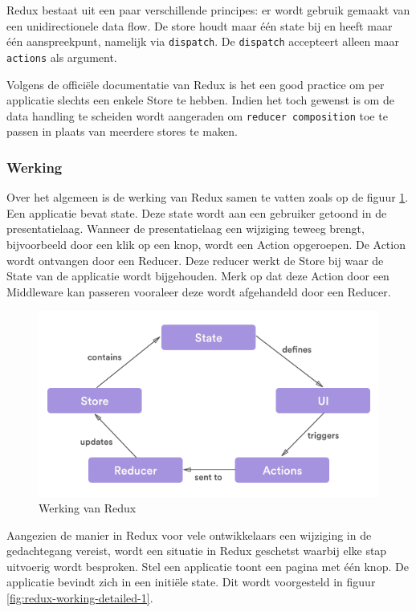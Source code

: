 Redux bestaat uit een paar verschillende principes: er wordt gebruik gemaakt van een unidirectionele data flow. De store houdt maar één state bij en heeft maar één aanspreekpunt, namelijk via \verb|dispatch|. De \verb|dispatch| accepteert alleen maar \verb|actions| als argument.

Volgens de officiële documentatie van Redux \autocite{Redux2019} is het een good practice om per applicatie slechts een enkele Store te hebben. Indien het toch gewenst is om de data handling te scheiden wordt aangeraden om \verb|reducer composition| toe te passen in plaats van meerdere stores te maken.

\subsubsection{Werking}
Over het algemeen is de werking van Redux samen te vatten zoals op de figuur \ref{fig:redux-working}. Een applicatie bevat state. Deze state wordt aan een gebruiker getoond in de presentatielaag. Wanneer de presentatielaag een wijziging teweeg brengt, bijvoorbeeld door een klik op een knop, wordt een Action opgeroepen. De Action wordt ontvangen door een Reducer. Deze reducer werkt de Store bij waar de State van de applicatie wordt bijgehouden. Merk op dat deze Action door een Middleware kan passeren vooraleer deze wordt afgehandeld door een Reducer.

\begin{figure}[H]
    \centering
    \includegraphics[width=\linewidth]{img/stand-van-zaken/redux-working.png}
    \caption{Werking van Redux \autocite{Tahir2018}}
    \label{fig:redux-working}
\end{figure}

Aangezien de manier in Redux voor vele ontwikkelaars een wijziging in de gedachtegang vereist, wordt een situatie in Redux geschetst waarbij elke stap uitvoerig wordt besproken.
Stel een applicatie toont een pagina met één knop. De applicatie bevindt zich in een initiële state. Dit wordt voorgesteld in figuur \ref{fig:redux-working-detailed-1}.


